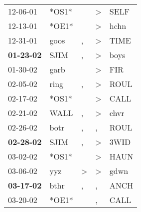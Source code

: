 \begin{supertabular}{p{0.07\textwidth}p{0.06\textwidth}p{0.02\textwidth}p{0.02\textwidth}p{0.06\textwidth}}
          12-06-01\textsuperscript{} &                            *OS1* &                  &     \textgreater &           SELF\textsuperscript{} \\
          12-13-01\textsuperscript{} &                            *OE1* &                  &     \textgreater &           hchn\textsuperscript{} \\
          12-31-01\textsuperscript{} &           goos\textsuperscript{} &                , &     \textgreater &           TIME\textsuperscript{} \\
 \textbf{01-23-02\textsuperscript{}} &           SJIM\textsuperscript{} &                , &     \textgreater &           boys\textsuperscript{} \\
          01-30-02\textsuperscript{} &           garb\textsuperscript{} &                  &     \textgreater &            FIR\textsuperscript{} \\
          02-05-02\textsuperscript{} &           ring\textsuperscript{} &                , &     \textgreater &           ROUL\textsuperscript{} \\
          02-17-02\textsuperscript{} &                            *OS1* &                  &     \textgreater &           CALL\textsuperscript{} \\
          02-21-02\textsuperscript{} &           WALL\textsuperscript{} &                , &     \textgreater &           chvr\textsuperscript{} \\
          02-26-02\textsuperscript{} &           botr\textsuperscript{} &                , &                , &           ROUL\textsuperscript{} \\
 \textbf{02-28-02\textsuperscript{}} &           SJIM\textsuperscript{} &                , &     \textgreater &           3WID\textsuperscript{} \\
          03-02-02\textsuperscript{} &                            *OS1* &                  &     \textgreater &           HAUN\textsuperscript{} \\
          03-06-02\textsuperscript{} &            yyz\textsuperscript{} &     \textgreater &     \textgreater &           gdwn\textsuperscript{} \\
 \textbf{03-17-02\textsuperscript{}} &           bthr\textsuperscript{} &                , &                , &           ANCH\textsuperscript{} \\
          03-20-02\textsuperscript{} &                            *OE1* &                  &                , &           CALL\textsuperscript{} \\

\end{supertabular}
